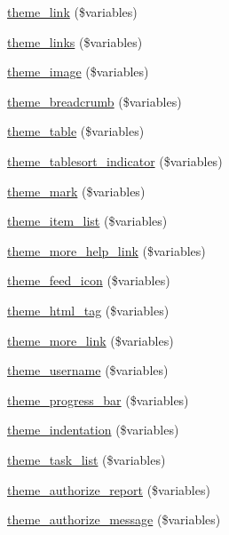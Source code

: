 \begin{DoxyCompactItemize}
\item 
\hyperlink{group__themeable_ga4ab7d25ecbea3d5367e75c965f7afe55}{theme\_\-link} (\$variables)
\item 
\hyperlink{group__themeable_gab75b290dbc9541e2fb0d9e57cbcdda5c}{theme\_\-links} (\$variables)
\item 
\hyperlink{group__themeable_gae97e7e2541a9eb4e69e72b6945fec32c}{theme\_\-image} (\$variables)
\item 
\hyperlink{group__themeable_gaf05700c211b33b8ae6b258e2946b782c}{theme\_\-breadcrumb} (\$variables)
\item 
\hyperlink{group__themeable_ga9e35aa108c35f87b588197138a51823d}{theme\_\-table} (\$variables)
\item 
\hyperlink{group__themeable_ga06cbe52fad2dac8196f8c89118c3975d}{theme\_\-tablesort\_\-indicator} (\$variables)
\item 
\hyperlink{group__themeable_ga10b9e641d13efcf0ed3e55fd03bc4f54}{theme\_\-mark} (\$variables)
\item 
\hyperlink{group__themeable_ga515afdc4832483a813cd09ba4786fdfe}{theme\_\-item\_\-list} (\$variables)
\item 
\hyperlink{group__themeable_ga59ab4d425ab4c43d94c26538fbe3e9aa}{theme\_\-more\_\-help\_\-link} (\$variables)
\item 
\hyperlink{group__themeable_gaf7ed9df27bf344443ce927e3650adfbd}{theme\_\-feed\_\-icon} (\$variables)
\item 
\hyperlink{group__themeable_ga553aba4a879c7a0b01a85486ca0cea33}{theme\_\-html\_\-tag} (\$variables)
\item 
\hyperlink{group__themeable_ga1f35c4f1e512ae423df22c7a33edf043}{theme\_\-more\_\-link} (\$variables)
\item 
\hyperlink{group__themeable_ga94b6d36f659ae6bf42e7971682cd24eb}{theme\_\-username} (\$variables)
\item 
\hyperlink{group__themeable_ga9892ce57f458f8e372fb04b7a05bbc73}{theme\_\-progress\_\-bar} (\$variables)
\item 
\hyperlink{group__themeable_ga045159ba9e2be46a91a8883328963b2c}{theme\_\-indentation} (\$variables)
\item 
\hyperlink{group__themeable_gacac34ad88b724d01c7ca68f7891f64db}{theme\_\-task\_\-list} (\$variables)
\item 
\hyperlink{group__themeable_gae1d7d2ad7f9c1e0be407bd99960811fd}{theme\_\-authorize\_\-report} (\$variables)
\item 
\hyperlink{group__themeable_ga56220e4ed7d88deb60333c0013ba72a6}{theme\_\-authorize\_\-message} (\$variables)

\end{DoxyCompactItemize}
